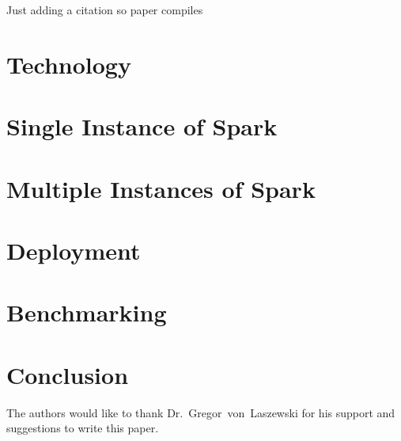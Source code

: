 Just adding a citation so paper compiles~\cite{las-example00}

\section{Technology}


\section{Single Instance of Spark}


\section{Multiple Instances of Spark}


\section{Deployment}


\section{Benchmarking}


\section{Conclusion}



\begin{acks}

  The authors would like to thank Dr.~Gregor~von~Laszewski for his
  support and suggestions to write this paper.

\end{acks}


 

